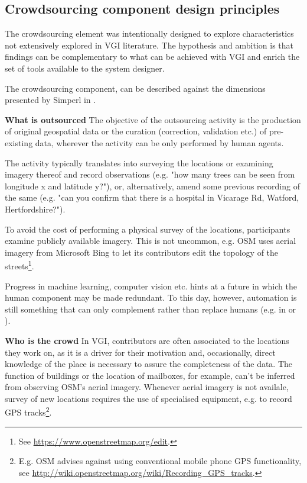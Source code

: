 \subsection{Crowdsourcing component design principles}

The crowdsourcing element was intentionally designed to explore characteristics not extensively explored in VGI literature. The hypothesis and ambition is that findings can be complementary to what can be achieved with VGI and enrich the set of tools available to the system designer.

The crowdsourcing component, can be described against the dimensions presented by Simperl in \cite{Wearethedata:2015uo}. 

\textbf{What is outsourced} The objective of the outsourcing activity is the production of original geospatial data or the curation (correction, validation etc.) of pre-existing data, wherever the activity can be only performed by human agents. 

The activity typically translates into surveying the locations or examining imagery thereof and record observations (e.g. "how many trees can be seen from longitude x and latitude y?"), or, alternatively, amend some previous recording of the same (e.g. "can you confirm that there is a hospital in Vicarage Rd, Watford, Hertfordshire?"). 

To avoid the cost of performing a physical survey of the locations, participants examine publicly available imagery. This is not uncommon, e.g. OSM uses aerial imagery from Microsoft Bing to let its contributors edit the topology of the streets\footnote{See \url{https://www.openstreetmap.org/edit}.}.

Progress in machine learning, computer vision etc. hints at a future in which the human component may be made redundant. To this day, however, automation is still something that can only complement rather than replace humans (e.g. in \cite{Goetz:1gd} or \cite{Schmid:2012we}).

\textbf{Who is the crowd} In VGI, contributors are often associated to the locations they work on, as it is a driver for their motivation and, occasionally, direct knowledge of the place is necessary to assure the completeness of the data. The function of buildings or the location of mailboxes, for example, can't be inferred from observing OSM's aerial imagery. Whenever aerial imagery is not availale, survey of new locations requires the use of specialised equipment, e.g. to record GPS tracks\footnote{E.g. OSM advises against using conventional mobile phone GPS functionality, see \url{http://wiki.openstreetmap.org/wiki/Recording_GPS_tracks}.}.

